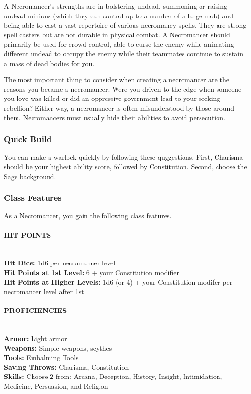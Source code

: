 \documentclass[10pt,twoside,twocolumn,openany]{book}
\begin{document}
A Necromancer's strengths are in bolstering undead, summoning or raising undead minions (which they can control up to a number of a large mob) and being able to cast a vast repertoire of various necromancy spells. They are strong spell casters but are not durable in physical combat. A Necromancer should primarily be used for crowd control, able to curse the enemy while animating different undead to occupy the enemy while their teammates continue to sustain a mass of dead bodies for you.

The most important thing to consider when creating a necromancer are the reasons you became a necromancer. Were you driven to the edge when someone you love was killed or did an oppressive government lead to your seeking rebellion? Either way, a necromancer is often misunderstood by those around them. Necromancers must usually hide their abilities to avoid persecution.

\subsubsection{Quick Build}
You can make a warlock quickly by following these quggestions. First, Charisma should be your highest ability score, followed by Constitution. Second, choose the Sage background.

\subsubsection{Class Features}
As a Necromancer, you gain the following class features.

\paragraph{HIT POINTS}\mbox{}\\
\textbf{Hit Dice:} 1d6 per necromancer level\\
\textbf{Hit Points at 1st Level:} 6 + your Constitution modifier\\
\textbf{Hit Points at Higher Levels:} 1d6 (or 4) + your  Constitution modifer per necromancer level after 1st

\paragraph{PROFICIENCIES}\mbox{}\\
\textbf{Armor:} Light armor\\
\textbf{Weapons:} Simple weapons, scythes\\
\textbf{Tools:} Embalming Tools\\
\textbf{Saving Throws:} Charisma, Constitution\\
\textbf{Skills:} Choose 2 from: Arcana, Deception, History, Insight, Intimidation, Medicine, Persuasion, and Religion
\end{document}
